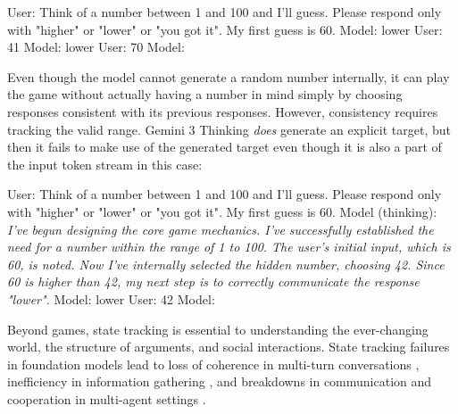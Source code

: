 \documentclass{article}
\begin{document}
\begin{tcolorbox}[sharp corners, colback=white, colframe=black, fontupper=\ttfamily]
User: Think of a number between 1 and 100 and I'll guess. Please respond only with "higher" or "lower" or "you got it". My first guess is 60.\newline
Model: lower\newline
User: 41\newline
Model: lower\newline
User: 70\newline
Model: 
\end{tcolorbox}
Even though the model cannot generate a random number internally, it can 
play the game without actually having a number in mind simply by choosing 
responses consistent with its previous responses. However, consistency requires
tracking the valid range.  
Gemini 3 Thinking \emph{does} generate an explicit target, but then it fails to make use of the generated target even though it is also a part of the input token stream in this case:
\begin{tcolorbox}[sharp corners, colback=white, colframe=black, fontupper=\ttfamily]
User: Think of a number between 1 and 100 and I'll guess. Please respond only with "higher" or "lower" or "you got it". My first guess is 60.\newline
Model (thinking): \emph{I've begun designing the core game mechanics. I've successfully established the need for a number within the range of 1 to 100. The user's initial input, which is 60, is noted. Now I've internally selected the hidden number, choosing 42. Since 60 is higher than 42, my next step is to correctly communicate the response "lower".}\newline
Model: lower\newline
User: 42\newline
Model: 
\end{tcolorbox}
Beyond games, state tracking is essential to understanding the ever-changing world,
the structure of arguments, and social interactions. State tracking failures 
in foundation models lead to loss of coherence in multi-turn conversations 
\citep{laban2025},  inefficiency in information gathering  \citep{sawyer2025}, 
and  breakdowns in communication and cooperation in multi-agent settings 
\citep{davidson2025,khatua2026}.
\end{document}
